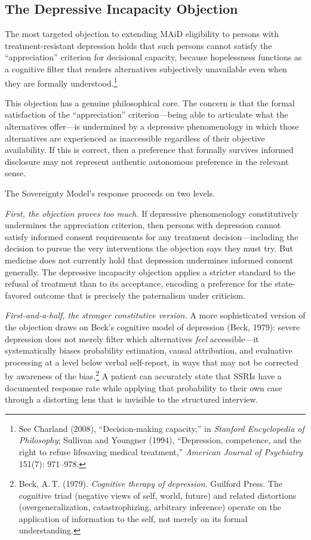 \documentclass[11pt, letterpaper]{article}
\begin{document}
\subsection{The Depressive Incapacity Objection}

The most targeted objection to extending MAiD eligibility to persons with
treatment-resistant depression holds that such persons cannot satisfy the
``appreciation'' criterion for decisional capacity, because hopelessness functions
as a cognitive filter that renders alternatives subjectively unavailable even when
they are formally understood.\footnote{%
  See Charland (2008), ``Decision-making capacity,'' in
  \textit{Stanford Encyclopedia of Philosophy}; Sullivan and Youngner (1994),
  ``Depression, competence, and the right to refuse lifesaving medical treatment,''
  \textit{American Journal of Psychiatry} 151(7): 971--978.}

This objection has a genuine philosophical core. The concern is that the formal
satisfaction of the ``appreciation'' criterion---being able to articulate what
the alternatives offer---is undermined by a depressive phenomenology in which
those alternatives are experienced as inaccessible regardless of their objective
availability. If this is correct, then a preference that formally survives informed
disclosure may not represent authentic autonomous preference in the relevant sense.

The Sovereignty Model's response proceeds on two levels.

\textit{First, the objection proves too much.} If depressive phenomenology
constitutively undermines the appreciation criterion, then persons with depression
cannot satisfy informed consent requirements for any treatment decision---including
the decision to pursue the very interventions the objection says they must try.
But medicine does not currently hold that depression undermines informed consent
generally. The depressive incapacity objection applies a stricter standard to the
refusal of treatment than to its acceptance, encoding a preference for the
state-favored outcome that is precisely the paternalism under criticism.

\textit{First-and-a-half, the stronger constitutive version.} A more sophisticated version
of the objection draws on Beck's cognitive model of depression (Beck, 1979): severe
depression does not merely filter which alternatives \textit{feel} accessible---it
systematically biases probability estimation, causal attribution, and evaluative
processing at a level below verbal self-report, in ways that may not be corrected by
awareness of the bias.\footnote{%
  Beck, A.\,T. (1979). \textit{Cognitive therapy of depression}. Guilford Press.
  The cognitive triad (negative views of self, world, future) and related distortions
  (overgeneralization, catastrophizing, arbitrary inference) operate on the application
  of information to the self, not merely on its formal understanding.}
A patient can accurately state that SSRIs have a documented response rate while applying
that probability to their own case through a distorting lens that is invisible to the
structured interview.
\end{document}
